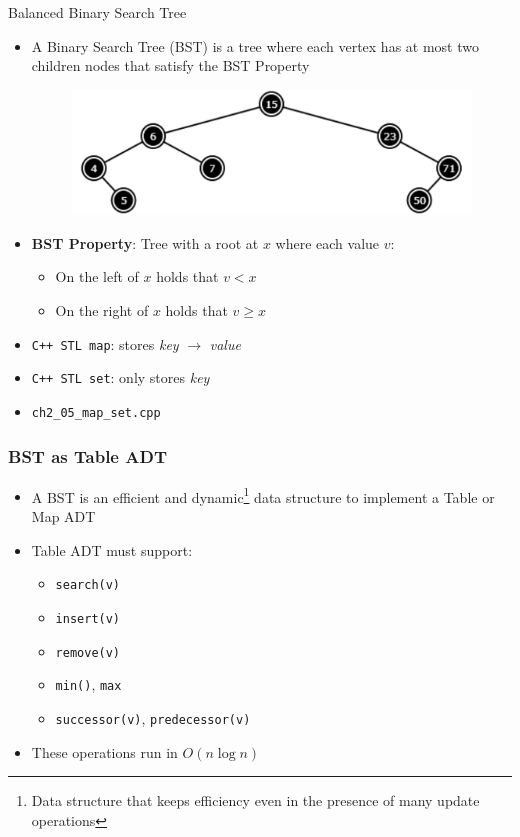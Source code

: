 \documentclass{beamer}
\begin{document}
\begin{frame}[fragile]{Balanced Binary Search Tree}
    \begin{itemize}
    	\item A Binary Search Tree (BST) is a tree where each vertex has at most two children nodes that satisfy the BST Property
		    \begin{figure}
		        \centering
    		    \includegraphics[scale=0.25]{imgs/2.3/bst/bst.png}
	    	\end{figure}
        \item \textbf{BST Property}: Tree with a root at $x$ where each value $v$:
            \begin{itemize}
                \item On the left of $x$ holds that $ v < x$
                \item On the right of $x$ holds that $ v \geq x$
            \end{itemize}
         \item \verb|C++ STL map|: stores \textit{key} $\rightarrow$ \textit{value}
         \item \verb|C++ STL set|: only stores \textit{key}
         \item \color{red} \verb|ch2_05_map_set.cpp| \color{black}
    \end{itemize}
\end{frame}

\begin{frame}[fragile]
\frametitle{BST as Table ADT}
	\begin{itemize}
         \item A BST is an efficient and dynamic\footnote{Data structure that keeps efficiency even in the presence of many update operations} data structure to implement a Table or Map ADT
         \item Table ADT must support:
         	\begin{itemize}
				\item \verb|search(v)|
				\item \verb|insert(v)|
				\item \verb|remove(v)|
				\item \verb|min()|, \verb|max|
				\item \verb|successor(v)|, \verb|predecessor(v)|
			\end{itemize}
		\item These operations run in $O(n\log n)$
	\end{itemize}
\end{frame}
\end{document}
